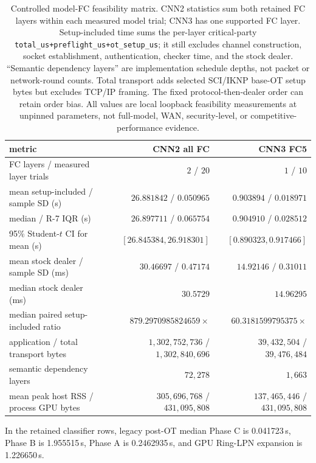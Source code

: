 \documentclass[11pt]{article}
\begin{document}
\begin{table}[ht]
\centering
\small
\begin{tabular}{@{}l rr@{}}
\toprule
metric & CNN2 all FC & CNN3 FC5\\
\midrule
FC layers / measured layer trials & $2$ / $20$ & $1$ / $10$\\
mean setup-included / sample SD (s) & $26.881842$ / $0.050965$ & $0.903894$ / $0.018971$\\
median / R-7 IQR (s) & $26.897711$ / $0.065754$ & $0.904910$ / $0.028512$\\
95\% Student-$t$ CI for mean (s) & $[26.845384,26.918301]$ & $[0.890323,0.917466]$\\
mean stock dealer / sample SD (ms) & $30.46697$ / $0.47174$ & $14.92146$ / $0.31011$\\
median stock dealer (ms) & $30.5729$ & $14.96295$\\
median paired setup-included ratio & $879.2970985824659\times$ & $60.3181599795375\times$\\
application / total transport bytes & $1{,}302{,}752{,}736$ / $1{,}302{,}840{,}696$ & $39{,}432{,}504$ / $39{,}476{,}484$\\
semantic dependency layers & $72{,}278$ & $1{,}663$\\
mean peak host RSS / process GPU bytes & $305{,}696{,}768$ / $431{,}095{,}808$ & $137{,}465{,}446$ / $431{,}095{,}808$\\
\bottomrule
\end{tabular}
\caption{Controlled model-FC feasibility matrix. CNN2 statistics sum both
retained FC layers within each measured model trial; CNN3 has one supported FC
layer. Setup-included time sums the per-layer critical-party
\texttt{total\_us+preflight\_us+ot\_setup\_us}; it still excludes channel
construction, socket establishment, authentication, checker time, and the
stock dealer. ``Semantic dependency layers'' are implementation schedule
depths, not packet or network-round counts. Total transport adds selected
SCI/IKNP base-OT setup bytes but excludes TCP/IP framing. The fixed
protocol-then-dealer order can retain order bias. All values are local
loopback feasibility measurements at unpinned parameters, not full-model,
WAN, security-level, or competitive-performance evidence.}
\label{tab:cnnmatrix}
\end{table}

In the retained classifier rows, legacy post-OT median Phase C is 0.041723\,s, Phase B is
1.955515\,s, Phase A is 0.2462935\,s, and GPU Ring-LPN expansion is
1.226650\,s.
\end{document}
